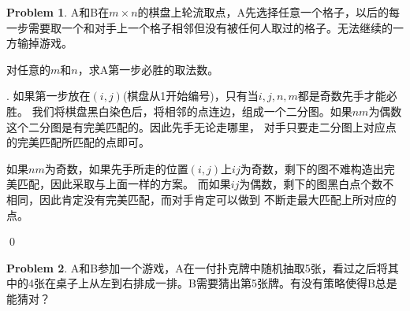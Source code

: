 \documentclass[UTF8]{ctexart}
\newenvironment{sol}
  {\par\vspace{3mm}\noindent{\it Solution}.}
  {\qed \\ \medskip}
\theoremstyle{definition}
\newtheorem{problem}{Problem}
\begin{document}
\begin{problem}
A和B在$m \times n$的棋盘上轮流取点，A先选择任意一个格子，以后的每一步需要取一个和对手上一个格子相邻但没有被任何人取过的格子。无法继续的一方输掉游戏。

对任意的$m$和$n$，求A第一步必胜的取法数。
\begin{sol}
    如果第一步放在$(i,j)$(棋盘从1开始编号)，只有当$i,j,n,m$都是奇数先手才能必胜。
    我们将棋盘黑白染色后，将相邻的点连边，组成一个二分图。如果$nm$为偶数这个二分图是有完美匹配的。因此先手无论走哪里，
    对手只要走二分图上对应点的完美匹配所匹配的点即可。

    如果$nm$为奇数，如果先手所走的位置$(i,j)$上$ij$为奇数，剩下的图不难构造出完美匹配，因此采取与上面一样的方案。
    而如果$ij$为偶数，剩下的图黑白点个数不相同，因此肯定没有完美匹配，而对手肯定可以做到
    不断走最大匹配上所对应的点。

\end{sol}
\end{problem}

\begin{problem}
A和B参加一个游戏，A在一付扑克牌中随机抽取5张，看过之后将其中的4张在桌子上从左到右排成一排。B需要猜出第5张牌。有没有策略使得B总是能猜对？
\end{problem}
\end{document}
